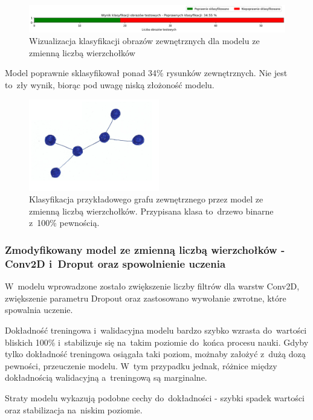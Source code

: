 \begin{figure}[ht]
	\centering
	\includegraphics[width=15.5cm]{resources/tests/images/v3/multiple_edges_bar.png}
	\caption{Wizualizacja klasyfikacji obrazów zewnętrznych dla modelu ze zmienną liczbą wierzchołków}
	\label{Fig:tests-var-0c}
\end{figure}
\FloatBarrier

Model poprawnie sklasyfikował ponad 34\% rysunków zewnętrznych.
Nie jest to~zły wynik, biorąc pod uwagę niską złożoność modelu.

\begin{figure}[ht]
	\centering
	\includegraphics[height=4cm]{../graph_classification/test_graphs/drawn/tree-binary-1.png}
	\caption{Klasyfikacja przykładowego grafu zewnętrznego przez model ze zmienną liczbą wierzchołków.
		Przypisana klasa to~drzewo binarne z~100\% pewnością.}
	\label{Fig:tests-var-0d}
\end{figure}
\FloatBarrier

\subsubsection{Zmodyfikowany model ze zmienną liczbą wierzchołków - Conv2D i~Droput oraz spowolnienie uczenia}

W~modelu wprowadzone zostało zwiększenie liczby filtrów dla warstw Conv2D, zwiększenie parametru Dropout
oraz zastosowano wywołanie zwrotne, które spowalnia uczenie.

Dokładność treningowa i~walidacyjna modelu bardzo szybko wzrasta do~wartości bliskich 100\%
i~stabilizuje się na~takim poziomie do~końca procesu nauki.
Gdyby tylko dokładność treningowa osiągała taki poziom, możnaby założyć z~dużą dozą pewności, przeuczenie modelu.
W~tym przypadku jednak, różnice między dokładnością walidacyjną a~treningową są marginalne.

Straty modelu wykazują podobne cechy do~dokładności - szybki spadek wartości oraz stabilizacja na~niskim poziomie.

